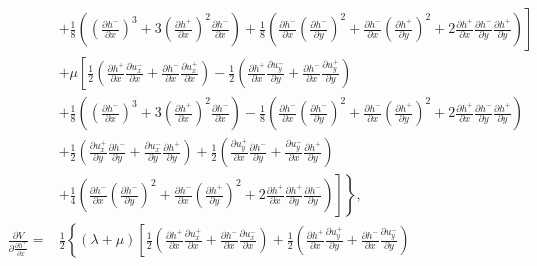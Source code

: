\documentclass[aps,prx,10pt,twocolumn,superscriptaddress]{revtex4}
\begin{document}
\begin{widetext}
\begin{align}
&\left.+\frac{1}{8}\left(\left( \frac{\partial h^{-}}{\partial x} \right)^{3}+3\left(\frac{\partial h^{+}}{\partial x}\right)^{2}\frac{\partial h^{-}}{\partial x}\right)+\frac{1}{8}\left( \frac{\partial h^{-}}{\partial x}\left(\frac{\partial h^{-}}{\partial y}\right)^{2}+\frac{\partial h^{-}}{\partial x}\left(\frac{\partial h^{+}}{\partial y}\right)^{2}+2\frac{\partial h^{+}}{\partial x}\frac{\partial h^{-}}{\partial y}\frac{\partial h^{+}}{\partial y} \right)\right]\nonumber\\
&+ \mu\left[ \frac{1}{2}\left( \frac{\partial h^{+}}{\partial x}\frac{\partial u^{-}_{x}}{\partial x}+\frac{\partial h^{-}}{\partial x}\frac{\partial u^{+}_{x}}{\partial x} \right) -\frac{1}{2}\left( \frac{\partial h^{+}}{\partial x}\frac{\partial u^{-}_{y}}{\partial y}+\frac{\partial h^{-}}{\partial x}\frac{\partial u^{+}_{y}}{\partial y} \right)  \right.\nonumber\\
&+\frac{1}{8}\left(\left( \frac{\partial h^{-}}{\partial x} \right)^{3}+3\left(\frac{\partial h^{+}}{\partial x}\right)^{2}\frac{\partial h^{-}}{\partial x}\right)-\frac{1}{8}\left( \frac{\partial h^{-}}{\partial x}\left(\frac{\partial h^{-}}{\partial y}\right)^{2}+\frac{\partial h^{-}}{\partial x}\left(\frac{\partial h^{+}}{\partial y}\right)^{2}+2\frac{\partial h^{+}}{\partial x}\frac{\partial h^{-}}{\partial y}\frac{\partial h^{+}}{\partial y} \right)\nonumber\\
&+\frac{1}{2}\left( \frac{\partial u^{+}_{x}}{\partial y}\frac{\partial h^{-}}{\partial y}+\frac{\partial u^{-}_{x}}{\partial y}\frac{\partial h^{+}}{\partial y} \right)+\frac{1}{2}\left( \frac{\partial u^{+}_{y}}{\partial x}\frac{\partial h^{-}}{\partial y}+\frac{\partial u^{-}_{y}}{\partial x}\frac{\partial h^{+}}{\partial y} \right)\nonumber\\
&\left.\left.+\frac{1}{4}\left(\frac{\partial h^{-}}{\partial x}\left(\frac{\partial h^{-}}{\partial y}\right)^{2}+\frac{\partial h^{-}}{\partial x}\left(\frac{\partial h^{+}}{\partial y}\right)^{2}+2\frac{\partial h^{+}}{\partial x}\frac{\partial h^{+}}{\partial y}\frac{\partial h^{-}}{\partial y}\right)\right]\right\},\nonumber\\
\frac{\partial V}{\partial \frac{\partial h^{+}}{\partial x}}=&\frac{1}{2}\left\{ (\lambda+\mu)\left[ \frac{1}{2}\left( \frac{\partial h^{+}}{\partial x}\frac{\partial u^{+}_{x}}{\partial x}+\frac{\partial h^{-}}{\partial x}\frac{\partial u^{-}_{x}}{\partial x} \right) +\frac{1}{2}\left( \frac{\partial h^{+}}{\partial x}\frac{\partial u^{+}_{y}}{\partial y}+\frac{\partial h^{-}}{\partial x}\frac{\partial u^{-}_{y}}{\partial y} \right)  \right. \right.\nonumber\\

\end{align}
\end{widetext}
\end{document}
